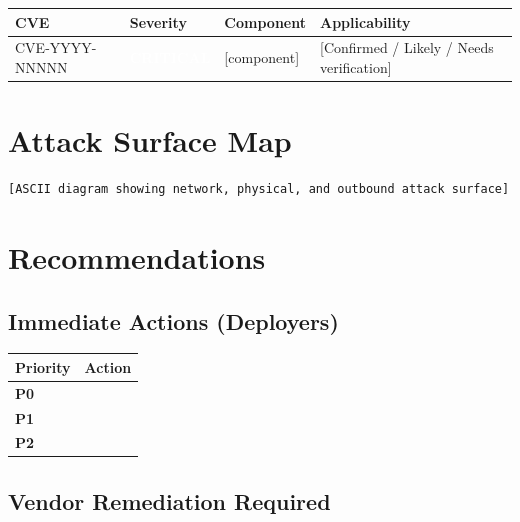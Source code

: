\documentclass[12pt,a4paper]{article}
\newcommand{\critical}[1]{\textcolor{white}{\colorbox{critical}{\textbf{#1}}}}
\begin{document}
\begin{tabularx}{\linewidth}{llXX}
  \toprule
  \rowcolor{tabhead}
  \textcolor{tabheadtext}{\textbf{CVE}} &
  \textcolor{tabheadtext}{\textbf{Severity}} &
  \textcolor{tabheadtext}{\textbf{Component}} &
  \textcolor{tabheadtext}{\textbf{Applicability}} \\
  \midrule
  CVE-YYYY-NNNNN & \critical{CRITICAL} & [component] &
    [Confirmed / Likely / Needs verification] \\
  \bottomrule
\end{tabularx}

\section{Attack Surface Map}\label{sec:attack-surface}

\begin{lstlisting}
[ASCII diagram showing network, physical, and outbound attack surface]
\end{lstlisting}

\section{Recommendations}\label{sec:recommendations}

\subsection{Immediate Actions (Deployers)}

\begin{tabularx}{\linewidth}{lX}
  \toprule
  \rowcolor{tabhead}
  \textcolor{tabheadtext}{\textbf{Priority}} &
  \textcolor{tabheadtext}{\textbf{Action}} \\
  \midrule
  \textbf{P0} & \\
  \rowcolor{rowalt}
  \textbf{P1} & \\
  \textbf{P2} & \\
  \bottomrule
\end{tabularx}

\subsection{Vendor Remediation Required}
\end{document}

